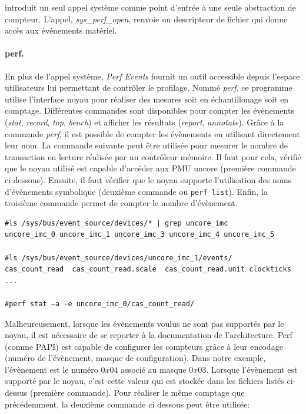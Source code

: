         
        introduit un seul appel système comme point d'entrée à une seule abstraction de compteur. L'appel, \textit{sys\_perf\_open}, renvoie un descripteur de fichier qui donne accès aux événements matériel. 
        
    
        \paragraph{perf.} 
        En plus de l'appel système, \textit{Perf Events} fournit un outil accessible depuis l'espace utilisateurs lui permettant de contrôler le profilage. Nommé \textit{perf}, ce programme utilise l'interface noyau pour réaliser des mesures soit en échantillonage soit en comptage. Différentes commandes sont disponibles pour compter les évènements (\textit{stat}, \textit{record}, \textit{top}, \textit{bench}) et afficher les résultats (\textit{report}, \textit{annotate}). Grâce à la commande \textit{perf}, il est possible de compter les évènements en utilisant directement leur nom. La commande suivante peut être utilisée pour mesurer le nombre de transaction en lecture réalisée par un contrôleur mémoire. Il faut pour cela, vérifié que le noyau utilisé est capable d'accéder aux PMU uncore (première commande ci dessous). Ensuite, il faut vérifier que le noyau supporte l'utilisation des noms d'évènements symbolique (deuxième commande ou \verb|perf list|). Enfin, la troisième commande permet de compter le nombre d'évènement.
        
\begin{verbatim}
#ls /sys/bus/event_source/devices/* | grep uncore_imc
uncore_imc_0 uncore_imc_1 uncore_imc_3 uncore_imc_4 uncore_imc_5

#ls /sys/bus/event_source/devices/uncore_imc_1/events/
cas_count_read  cas_count_read.scale  cas_count_read.unit clockticks ...         

#perf stat –a -e uncore_imc_0/cas_count_read/
\end{verbatim}
        
        Malheureusement, lorsque les évènements voulus ne sont pas supportés par le noyau, il est nécessaire de se reporter à la documentation de l'architecture. Perf (comme PAPI) est capable de configurer les compteurs grâce à leur encodage (numéro de l'évènement, masque de configuration). Dans notre exemple, l'évènement est le numéro $0x04$ associé au masque $0x03$. Lorsque l'évènement est supporté par le noyau, c'est cette valeur qui est stockée dans les fichiers listés ci-dessus (première commande). Pour réaliser le même comptage que précédemment, la deuxième commande ci dessous peut être utilisée:
        
